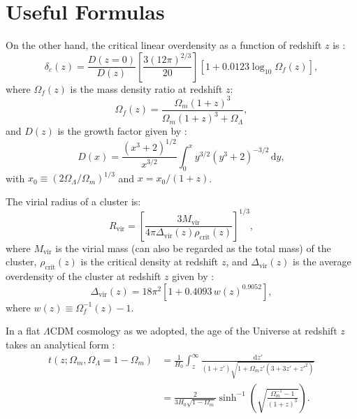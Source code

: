\documentclass[modern]{aastex62}
\newcommand{\R}[1]{\mathrm{#1}}
\newcommand{\D}[1]{\R{d} #1}
\newcommand{\lcdm}{$\Lambda$CDM}
\begin{document}
\section{Useful Formulas}
\label{sec:formulas}


On the other hand, the critical linear overdensity as a function of
redshift $z$ is \citep{kitayama1996,randall2002}:
\begin{equation}
  \label{eq:delta-crit}
  \delta_c(z) = \frac{D(z=0)}{D(z)}
  \left[ \frac{3 (12\pi)^{2/3}}{20} \right]
  \left[1 + 0.0123 \log_{10} \Omega_f(z) \right],
\end{equation}
where $\Omega_f(z)$ is the mass density ratio at redshift $z$:
\begin{equation}
  \label{eq:omega-fz}
  \Omega_f(z) = \frac{\Omega_m(1+z)^3}{\Omega_m(1+z)^3 + \Omega_{\Lambda}},
\end{equation}
and $D(z)$ is the growth factor given by
\citep[Equation~(13.6)]{peebles1980}:
\begin{equation}
  \label{eq:growth-factor}
  D(x) = \frac{(x^3 + 2)^{1/2}}{x^{3/2}}
    \int_0^x y^{3/2} (y^3 + 2)^{-3/2} \,\D{y},
\end{equation}
with $x_0 \equiv (2\Omega_{\Lambda}/\Omega_m)^{1/3}$ and
$x = x_0 / (1+z)$.

The virial radius of a cluster is:
\begin{equation}
  \label{eq:radius-virial}
  R_{\R{vir}} = \left[
    \frac{3 M_{\R{vir}}}{4\pi \Delta_{\R{vir}}(z) \rho_{\R{crit}}(z)}
  \right]^{1/3},
\end{equation}
where $M_{\R{vir}}$ is the virial mass (can also be regarded as
the total mass) of the cluster,
$\rho_{\R{crit}}(z)$ is the critical density at redshift $z$,
and $\Delta_{\R{vir}}(z)$ is the average overdensity of the cluster
at redshift $z$ given by \citep{kitayama1996,cassano2005}:
\begin{equation}
  \label{eq:delta-vir}
  \Delta_{\R{vir}}(z) = 18\pi^2 \left[ 1 + 0.4093 \, w(z)^{0.9052} \right],
\end{equation}
where $w(z) \equiv \Omega_f^{-1}(z) - 1$.

In a flat \lcdm{} cosmology as we adopted, the age of the Universe
at redshift $z$ takes an analytical form
\citep[their Equation~(18)]{thomas2000}:
\begin{align}
  \label{eq:universe-age}
  t(z; \Omega_m, \Omega_{\Lambda}=1-\Omega_m)
    & = \frac{1}{H_0} \int_z^{\infty}
      \frac{\D{z'}}{(1+z')\sqrt{1 + \Omega_m z' (3+3z'+z'^2)}} \nonumber \\
    & = \frac{2}{3 H_0 \sqrt{1-\Omega_m}} \sinh^{-1} \!\left(
      \sqrt{\frac{\Omega_m^{-1} - 1}{(1+z)^3}} \right).
\end{align}





\end{document}
